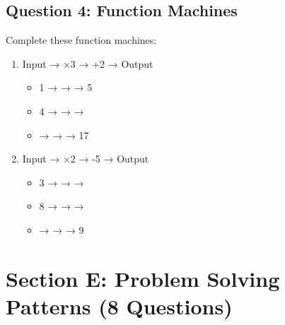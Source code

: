 \documentclass{article}
\begin{document}
\subsection*{Question 4: Function Machines}

Complete these function machines:

\begin{enumerate}
    \item Input → ×3 → +2 → Output
          \begin{itemize}
              \item 1 → \underline{\hspace{1cm}} → \underline{\hspace{1cm}} → 5
              \item 4 → \underline{\hspace{1cm}} → \underline{\hspace{1cm}} → \underline{\hspace{1cm}}
              \item \underline{\hspace{1cm}} → \underline{\hspace{1cm}} → \underline{\hspace{1cm}} → 17
          \end{itemize}
    
    \item Input → ×2 → -5 → Output
          \begin{itemize}
              \item 3 → \underline{\hspace{1cm}} → \underline{\hspace{1cm}} → \underline{\hspace{1cm}}
              \item 8 → \underline{\hspace{1cm}} → \underline{\hspace{1cm}} → \underline{\hspace{1cm}}
              \item \underline{\hspace{1cm}} → \underline{\hspace{1cm}} → \underline{\hspace{1cm}} → 9
          \end{itemize}
\end{enumerate}

\section{Section E: Problem Solving Patterns (8 Questions)}
\end{document}
